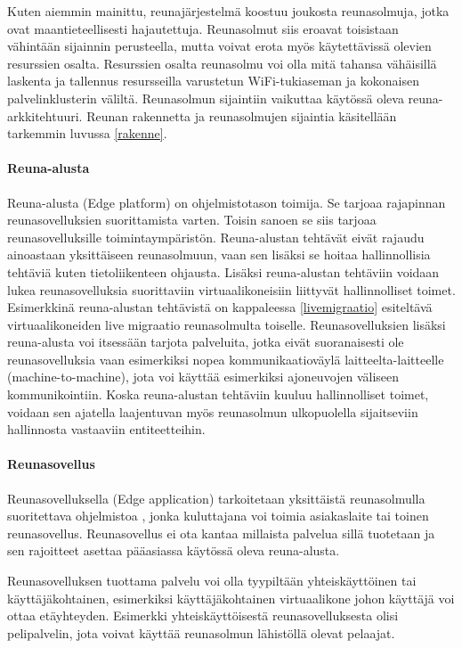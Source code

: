 Kuten aiemmin mainittu, reunajärjestelmä koostuu joukosta reunasolmuja, jotka ovat maantieteellisesti hajautettuja.
Reunasolmut siis eroavat toisistaan vähintään sijainnin perusteella, mutta voivat erota myös käytettävissä olevien resurssien osalta. Resurssien osalta reunasolmu voi olla mitä tahansa vähäisillä laskenta ja tallennus resursseilla varustetun WiFi-tukiaseman ja kokonaisen palvelinklusterin väliltä.
Reunasolmun sijaintiin vaikuttaa käytössä oleva reuna-arkkitehtuuri.
Reunan rakennetta ja  reunasolmujen sijaintia käsitellään tarkemmin luvussa \ref{rakenne}.

\paragraph{Reuna-alusta}
Reuna-alusta (Edge platform) on ohjelmistotason toimija. Se tarjoaa rajapinnan reunasovelluksien suorittamista varten\cite{etsirefarch}. Toisin sanoen se siis tarjoaa reunasovelluksille toimintaympäristön.
Reuna-alustan tehtävät eivät rajaudu ainoastaan yksittäiseen reunasolmuun, vaan sen lisäksi se hoitaa hallinnollisia tehtäviä kuten tietoliikenteen ohjausta. Lisäksi reuna-alustan tehtäviin voidaan lukea reunasovelluksia suorittaviin virtuaalikoneisiin liittyvät hallinnolliset toimet. Esimerkkinä reuna-alustan tehtävistä on kappaleessa \ref{livemigraatio} esiteltävä virtuaalikoneiden live migraatio reunasolmulta toiselle.
Reunasovelluksien lisäksi reuna-alusta voi itsessään tarjota palveluita, jotka eivät suoranaisesti ole reunasovelluksia vaan esimerkiksi nopea kommunikaatioväylä laitteelta-laitteelle (machine-to-machine), jota voi käyttää esimerkiksi ajoneuvojen väliseen kommunikointiin.
Koska reuna-alustan tehtäviin kuuluu hallinnolliset toimet, voidaan sen ajatella laajentuvan myös reunasolmun ulkopuolella sijaitseviin hallinnosta vastaaviin entiteetteihin.

\paragraph{Reunasovellus}
Reunasovelluksella (Edge application) tarkoitetaan yksittäistä reunasolmulla suoritettava ohjelmistoa \cite{etsirefarch}, jonka kuluttajana voi toimia asiakaslaite tai toinen reunasovellus. Reunasovellus ei ota kantaa millaista palvelua sillä tuotetaan ja sen rajoitteet asettaa pääasiassa käytössä oleva reuna-alusta. 

Reunasovelluksen tuottama palvelu voi olla tyypiltään yhteiskäyttöinen tai käyttäjäkohtainen, esimerkiksi käyttäjäkohtainen virtuaalikone johon käyttäjä voi ottaa etäyhteyden. Esimerkki yhteiskäyttöisestä reunasovelluksesta olisi pelipalvelin, jota voivat käyttää reunasolmun lähistöllä olevat pelaajat.

